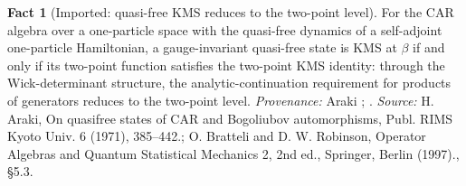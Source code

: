 \documentclass[11pt]{article}
\theoremstyle{definition}
\newtheorem{fact}[theorem]{Fact}
\theoremstyle{plain}
\begin{document}
\begin{fact}[Imported: quasi-free KMS reduces to the two-point level]\label{c:hawking.imported-quasi-free-kms-reduces-two}
For the CAR algebra over a one-particle space with the quasi-free dynamics of a self-adjoint one-particle Hamiltonian, a gauge-invariant quasi-free state is KMS at $\beta$ if and only if its two-point function satisfies the two-point KMS identity: through the Wick-determinant structure, the analytic-continuation requirement for products of generators reduces to the two-point level. \emph{Provenance:} Araki \cite{Araki1971}; \cite[\S 5.3]{BratteliRobinson1997}.
\emph{Source:} H. Araki, On quasifree states of CAR and Bogoliubov automorphisms, Publ. RIMS Kyoto Univ. 6 (1971), 385--442.; O. Bratteli and D. W. Robinson, Operator Algebras and Quantum Statistical Mechanics 2, 2nd ed., Springer, Berlin (1997)., \S 5.3.
\end{fact}
\end{document}
